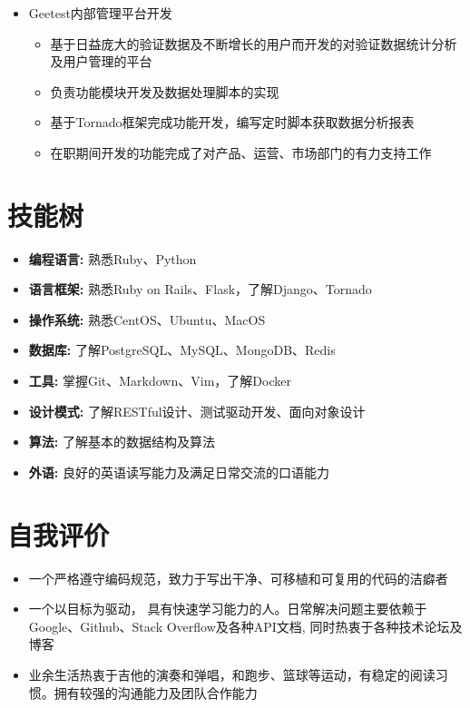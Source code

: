 \documentclass[11pt, a4paper,sans]{moderncv}     %
\begin{document}
\begin{itemize}
\begin{itemize}
    \item{\yahei Geetest内部管理平台开发}
    \begin{itemize}
      \item{\yahei 基于日益庞大的验证数据及不断增长的用户而开发的对验证数据统计分析及用户管理的平台}
      \item{\yahei 负责功能模块开发及数据处理脚本的实现}
      \item{\yahei 基于Tornado框架完成功能开发，编写定时脚本获取数据分析报表}
      \item{\yahei 在职期间开发的功能完成了对产品、运营、市场部门的有力支持工作}
    \end{itemize}
  \end{itemize}

\end{itemize}
\vspace{-8pt}

\section{\yahei 技能树}
\begin{itemize}
  \item{\yahei \textbf{编程语言:} 熟悉Ruby、Python}
  \item{\yahei \textbf{语言框架:} 熟悉Ruby on Rails、Flask，了解Django、Tornado}
  \item{\yahei \textbf{操作系统:} 熟悉CentOS、Ubuntu、MacOS}
  \item{\yahei \textbf{数据库:} 了解PostgreSQL、MySQL、MongoDB、Redis}
  \item{\yahei \textbf{工具:} 掌握Git、Markdown、Vim，了解Docker}
  \item{\yahei \textbf{设计模式:} 了解RESTful设计、测试驱动开发、面向对象设计}
  \item{\yahei \textbf{算法:} 了解基本的数据结构及算法}
  \item{\yahei \textbf{外语:} 良好的英语读写能力及满足日常交流的口语能力}
\end{itemize}
\vspace{-8pt}

\section{\yahei 自我评价}

\begin{itemize}
  \item{\yahei 一个严格遵守编码规范，致力于写出干净、可移植和可复用的代码的洁癖者}
  \item{\yahei 一个以目标为驱动， 具有快速学习能力的人。日常解决问题主要依赖于Google、Github、Stack Overflow及各种API文档, 同时热衷于各种技术论坛及博客}
  \item{\yahei 业余生活热衷于吉他的演奏和弹唱，和跑步、篮球等运动，有稳定的阅读习惯。拥有较强的沟通能力及团队合作能力}
\end{itemize}
\end{document}
